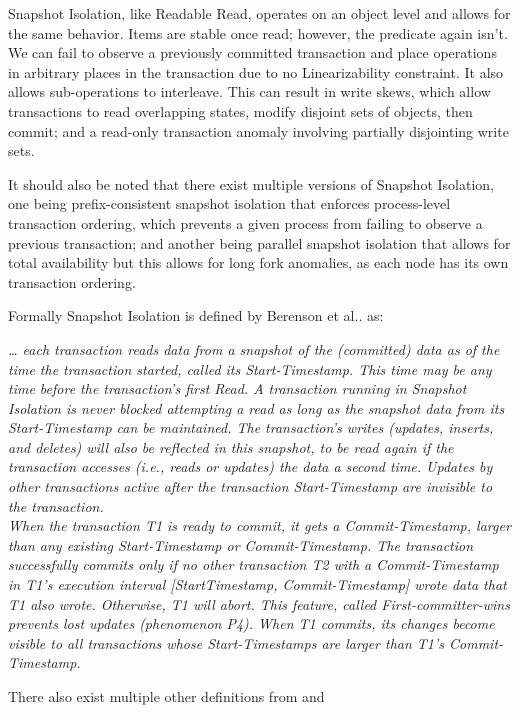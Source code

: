 \documentclass[a4paper,10pt,titlepage]{report}
\begin{document}
    Snapshot Isolation, like Readable Read, operates on an object level and allows for the same behavior. Items are stable once read; however, the predicate again isn't. We can fail to observe a previously committed transaction and place operations in arbitrary places in the transaction due to no Linearizability constraint. It also allows sub-operations to interleave. This can result in write skews, which allow transactions to read overlapping states, modify disjoint sets of objects, then commit; and a read-only transaction anomaly involving partially disjointing write sets.


    It should also be noted that there exist multiple versions of Snapshot Isolation, one being prefix-consistent snapshot isolation that enforces process-level transaction ordering, which prevents a given process from failing to observe a previous transaction; and another being parallel snapshot isolation that allows for total availability but this allows for long fork anomalies, as each node has its own transaction ordering.

    Formally Snapshot Isolation is defined by Berenson et al.\cite{Berensonetal}. as:

    \textit{… each transaction reads data from a snapshot of the (committed) data as of the time the transaction started, called its Start-Timestamp. This time may be any time before the transaction's first Read. A transaction running in Snapshot Isolation is never blocked attempting a read as long as the snapshot data from its Start-Timestamp can be maintained. The transaction's writes (updates, inserts, and deletes) will also be reflected in this snapshot, to be read again if the transaction accesses (i.e., reads or updates) the data a second time. Updates by other transactions active after the transaction Start-Timestamp are invisible to the transaction.
    \\
    When the transaction T1 is ready to commit, it gets a Commit-Timestamp, larger than any existing Start-Timestamp or Commit-Timestamp. The transaction successfully commits only if no other transaction T2 with a Commit-Timestamp in T1's execution interval [StartTimestamp, Commit-Timestamp] wrote data that T1 also wrote. Otherwise, T1 will abort. This feature, called First-committer-wins prevents lost updates (phenomenon P4). When T1 commits, its changes become visible to all transactions whose Start-Timestamps are larger than T1's Commit-Timestamp.}

    There also exist multiple other definitions from \cite{CeroneBernardiGotsman} and \cite{CrooksPuAlvisiClement}
\end{document}
